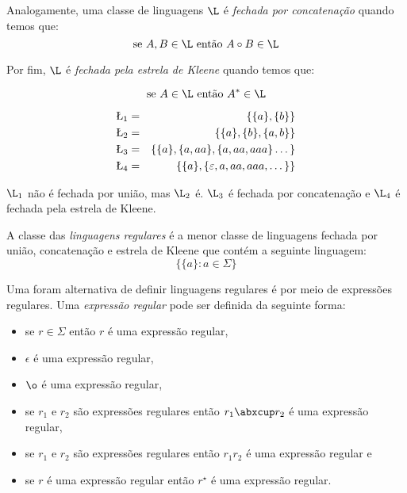 Analogamente, uma classe de linguagens $\L$ é {\em fechada por concatenação} quando temos que:
\begin{displaymath}
\textrm{se }  A, B \in \L \textrm{ então } A \circ B \in \L
\end{displaymath}

Por fim, $\L$ é {\em fechada pela estrela de Kleene} quando temos que:

\begin{displaymath}
\textrm{se }  A \in \L \textrm{ então } A^* \in \L
\end{displaymath}

\begin{example}
  \begin{eqnarray*}
    \L_1 & = & \{\{a\}, \{b\}\} \\
    \L_2 & = & \{\{a\}, \{b\}, \{a, b\}\}\\
    \L_3 & = & \{\{a\}, \{a, aa\}, \{a, aa, aaa\} \dots\}\\
    \L_4 & = & \{\{a\}, \{\varepsilon, a, aa, aaa, \dots\}\}\\
  \end{eqnarray*}

  $\L_1$ não é fechada por união, mas $\L_2$ é.
  $\L_3$ é fechada por concatenação e $\L_4$ é fechada pela estrela de Kleene.
\end{example}

A classe das {\em linguagens regulares} é a menor classe de linguagens fechada por união, concatenação e estrela de Kleene que contém a seguinte linguagem:
\begin{displaymath}
  \{\{a\} : a \in \Sigma\}
\end{displaymath}

Uma foram alternativa de definir linguagens regulares é por meio de expressões regulares.
Uma {\em expressão regular} pode ser definida da seguinte forma:
\begin{itemize}
\item[] se $r \in \Sigma$ então $r$ é uma expressão regular,
\item[] $\epsilon$ é uma expressão regular,
\item[] $\o$ é uma expressão regular,
\item[] se $r_1$ e $r_2$ são expressões regulares então $r_1 \abxcup r_2$ é uma expressão regular,
\item[] se $r_1$ e $r_2$ são expressões regulares então $r_1 r_2$ é uma expressão regular e
\item[] se $r$ é uma expressão regular então $r^\star$ é uma expressão regular.
\end{itemize}


